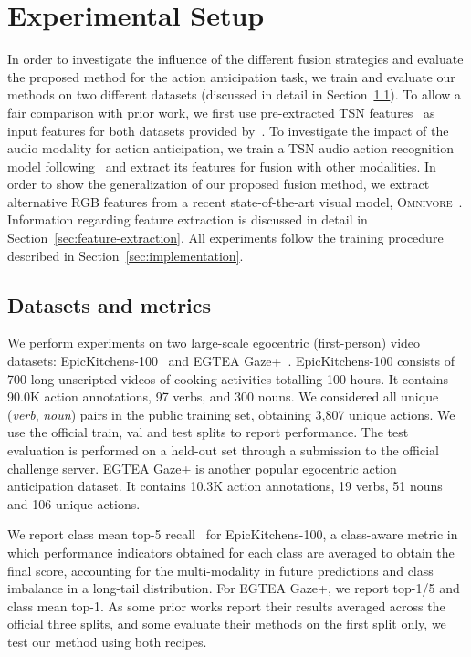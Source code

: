 \documentclass[10pt,twocolumn,letterpaper,dvipsnames]{article}
\begin{document}
 \section{Experimental Setup}
In order to investigate the influence of the different fusion strategies and evaluate the proposed method for the action anticipation task, we train and evaluate our methods on two different datasets (discussed in detail in Section~\ref{sec:datasets}). To allow a fair comparison with prior work, we first use pre-extracted TSN features~\cite{wangTemporalSegmentNetworks2016} as input features for both datasets provided by~\cite{furnariWhatWouldYou2019}. To investigate the impact of the audio modality for action anticipation, we train a TSN audio action recognition model following~\cite{kazakosEPICFusionAudioVisualTemporal2019} and extract its features for fusion with other modalities. In order to show the generalization of our proposed fusion method, we extract alternative RGB features from a recent state-of-the-art visual model, \textsc{Omnivore}~\cite{girdharOmnivoreSingleModel2022}. Information regarding feature extraction is discussed in detail in Section~\ref{sec:feature-extraction}. All experiments follow the training procedure described in Section~\ref{sec:implementation}.

\subsection{Datasets and metrics}
\label{sec:datasets}
We perform experiments on two large-scale egocentric (first-person) video datasets: EpicKitchens-100~\cite{damen2020epic} and EGTEA Gaze+~\cite{li2018eye}. EpicKitchens-100 consists of 700 long unscripted videos of cooking activities totalling 100 hours. It contains 90.0K action annotations, 97 verbs, and 300 nouns. We considered all unique (\textit{verb}, \textit{noun}) pairs in the public training set, obtaining 3,807 unique actions. We use the official train, val and test splits to report performance. The test evaluation is performed on a held-out set through a submission to the official challenge server. EGTEA Gaze+ is another popular egocentric action anticipation dataset. It contains 10.3K action annotations, 19 verbs, 51 nouns and 106 unique actions.

We report class mean top-5 recall~\cite{furnariLeveragingUncertaintyRethink2018} for EpicKitchens-100, a class-aware metric in which performance indicators obtained for each class are averaged to obtain the final score, accounting for the multi-modality in future predictions and class imbalance in a long-tail distribution. For EGTEA Gaze+, we report top-1/5 and class mean top-1. As some prior works report their results averaged across the official three splits, and some evaluate their methods on the first split only, we test our method using both recipes.
\end{document}
